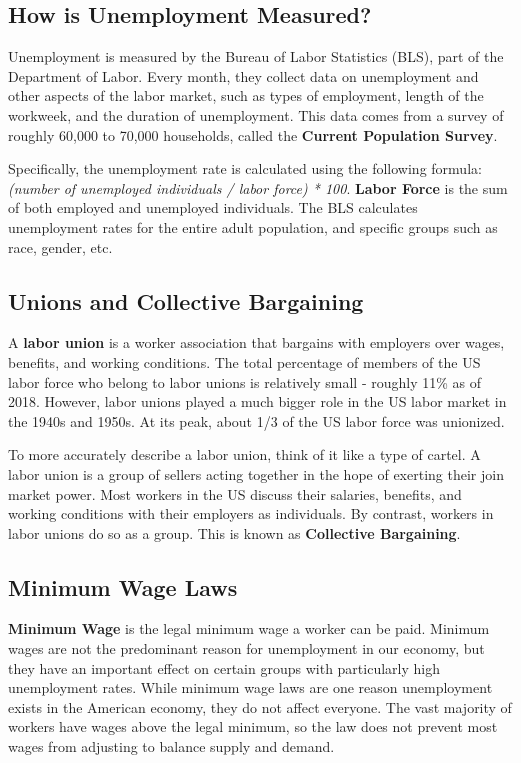 \documentclass{article}
\begin{document}
\subsection{How is Unemployment Measured?}
Unemployment is measured by the Bureau of Labor Statistics (BLS), part of the Department of Labor. Every month, they collect data on unemployment and other aspects of the labor market, such as types of employment, length of the workweek, and the duration of unemployment. This data comes from a survey of roughly 60,000 to 70,000 households, called the \textbf{Current Population Survey}.

Specifically, the unemployment rate is calculated using the following formula: \textit{(number of unemployed individuals / labor force) * 100}. \textbf{Labor Force} is the sum of both employed and unemployed individuals. The BLS calculates unemployment rates for the entire adult population, and specific groups such as race, gender, etc.

\subsection{Unions and Collective Bargaining}
A \textbf{labor union} is a worker association that bargains with employers over wages, benefits, and working conditions. The total percentage of members of the US labor force who belong to labor unions is relatively small - roughly 11\% as of 2018. However, labor unions played a much bigger role in the US labor market in the 1940s and 1950s. At its peak, about 1/3 of the US labor force was unionized.

To more accurately describe a labor union, think of it like a type of cartel. A labor union is a group of sellers acting together in the hope of exerting their join market power. Most workers in the US discuss their salaries, benefits, and working conditions with their employers as individuals. By contrast, workers in labor unions do so as a group. This is known as \textbf{Collective Bargaining}.

\subsection{Minimum Wage Laws}
\textbf{Minimum Wage} is the legal minimum wage a worker can be paid. Minimum wages are not the predominant reason for unemployment in our economy, but they have an important effect on certain groups with particularly high unemployment rates. While minimum wage laws are one reason unemployment exists in the American economy, they do not affect everyone. The vast majority of workers have wages above the legal minimum, so the law does not prevent most wages from adjusting to balance supply and demand.
\end{document}
